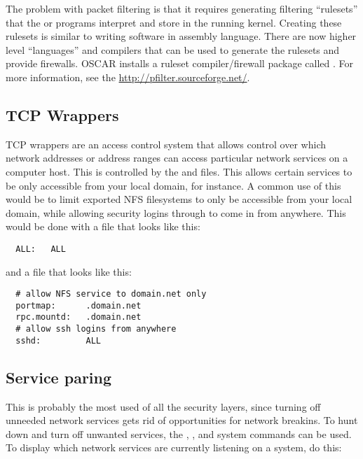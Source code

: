 The problem with packet filtering is that it requires generating
filtering ``rulesets'' that the  or 
programs interpret and store in the running kernel.  Creating these
rulesets is similar to writing software in assembly language. There
are now higher level ``languages'' and compilers that can be used to
generate the rulesets and provide firewalls.  OSCAR installs a ruleset
compiler/firewall package called .  For more
information, see the \url{http://pfilter.sourceforge.net/}.

\subsection{TCP Wrappers}

TCP wrappers are an access control system that allows control over
which network addresses or address ranges can access particular
network services on a computer host.  This is controlled by the
 and  files. This allows
certain services to be only accessible from your local domain, for
instance.  A common use of this would be to limit exported NFS
filesystems to only be accessible from your local domain, while
allowing security logins through  to come in from anywhere.
This would be done with a  file that looks like
this:

\begin{verbatim}
  ALL:   ALL
\end{verbatim}

\noindent and a  file that looks like this:

\begin{verbatim}
  # allow NFS service to domain.net only
  portmap:      .domain.net
  rpc.mountd:   .domain.net
  # allow ssh logins from anywhere
  sshd:         ALL
\end{verbatim}

\subsection{Service paring}

This is probably the most used of all the security layers, since
turning off unneeded network services gets rid of opportunities for
network breakins.  To hunt down and turn off unwanted services, the
, , and  system commands can be
used.  To display which network services are currently listening on a
system, do this:

